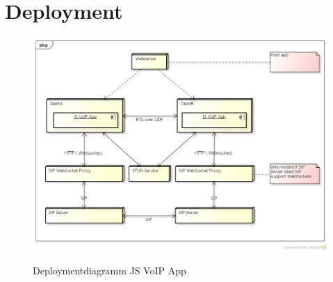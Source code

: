 \clearpage
\section{Deployment}
	\begin{figure}[h]
		\centering
		\includegraphics[height=0.7\textwidth]{../architekturanalayse/img/deployment.png}
		\label{img:deployment}
		\caption{Deploymentdiagramm JS VoIP App}
	\end{figure}
	